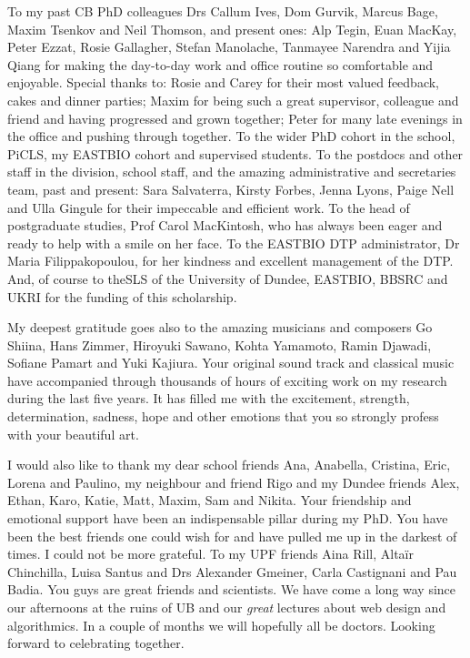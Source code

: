To my past CB PhD colleagues Drs Callum Ives, Dom Gurvik, Marcus Bage, Maxim Tsenkov and Neil Thomson, and present ones: Alp Tegin, Euan MacKay, Peter Ezzat, Rosie Gallagher, Stefan Manolache, Tanmayee Narendra and Yijia Qiang for making the day-to-day work and office routine so comfortable and enjoyable. Special thanks to: Rosie and Carey for their most valued feedback, cakes and dinner parties; Maxim for being such a great supervisor, colleague and friend and having progressed and grown together; Peter for many late evenings in the office and pushing through together. To the wider PhD cohort in the school, PiCLS, my EASTBIO cohort and supervised students. To the postdocs and other staff in the division, school staff, and the amazing administrative and secretaries team, past and present: Sara Salvaterra, Kirsty Forbes, Jenna Lyons, Paige Nell and Ulla Gingule for their impeccable and efficient work. To the head of postgraduate studies, Prof Carol MacKintosh, who has always been eager and ready to help with a smile on her face. To the EASTBIO DTP administrator, Dr Maria Filippakopoulou, for her kindness and excellent management of the DTP. And, of course to theSLS of the University of Dundee, EASTBIO, BBSRC and UKRI for the funding of this scholarship.

My deepest gratitude goes also to the amazing musicians and composers Go Shiina, Hans Zimmer, Hiroyuki Sawano, Kohta Yamamoto, Ramin Djawadi, Sofiane Pamart and Yuki Kajiura. Your original sound track and classical music have accompanied through thousands of hours of exciting work on my research during the last five years. It has filled me with the excitement, strength, determination, sadness, hope and other emotions that you so strongly profess with your beautiful art. 

I would also like to thank my dear school friends Ana, Anabella, Cristina, Eric, Lorena and Paulino, my neighbour and friend Rigo and my Dundee friends Alex, Ethan, Karo, Katie, Matt, Maxim, Sam and Nikita. Your friendship and emotional support have been an indispensable pillar during my PhD. You have been the best friends one could wish for and have pulled me up in the darkest of times. I could not be more grateful. To my UPF friends Aina Rill, Altaïr Chinchilla, Luisa Santus and Drs Alexander Gmeiner, Carla Castignani and Pau Badia. You guys are great friends and scientists. We have come a long way since our afternoons at the ruins of UB and our \textit{great} lectures about web design and algorithmics. In a couple of months we will hopefully all be doctors. Looking forward to celebrating together.

